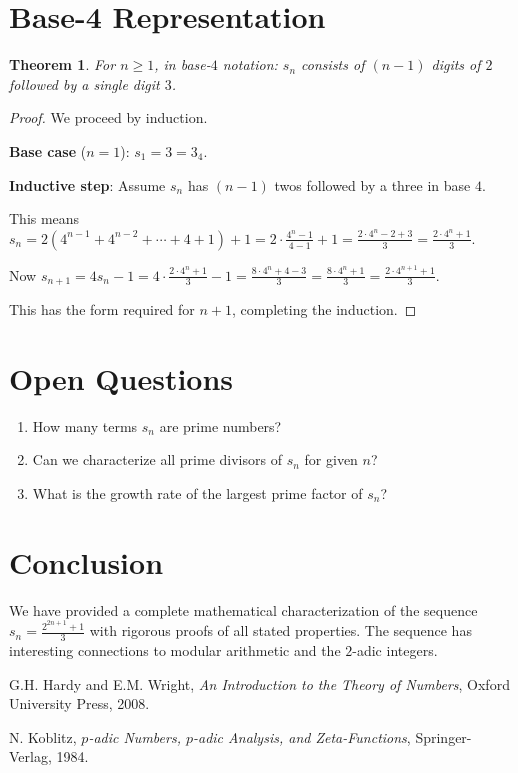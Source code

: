 \documentclass[11pt]{article}
\newtheorem{theorem}{Theorem}[section]
\theoremstyle{definition}
\begin{document}
\section{Base-4 Representation}

\begin{theorem}
For $n \geq 1$, in base-$4$ notation: $s_n$ consists of $(n-1)$ digits of $2$ followed by a single digit $3$.
\end{theorem}

\begin{proof}
We proceed by induction.

\textbf{Base case} ($n=1$): $s_1 = 3 = 3_4$. \checkmark

\textbf{Inductive step}: Assume $s_n$ has $(n-1)$ twos followed by a three in base $4$.

This means $s_n = 2(4^{n-1} + 4^{n-2} + \cdots + 4 + 1) + 1 = 2 \cdot \frac{4^n - 1}{4 - 1} + 1 = \frac{2 \cdot 4^n - 2 + 3}{3} = \frac{2 \cdot 4^n + 1}{3}$.

Now $s_{n+1} = 4s_n - 1 = 4 \cdot \frac{2 \cdot 4^n + 1}{3} - 1 = \frac{8 \cdot 4^n + 4 - 3}{3} = \frac{8 \cdot 4^n + 1}{3} = \frac{2 \cdot 4^{n+1} + 1}{3}$.

This has the form required for $n+1$, completing the induction.
\end{proof}

\section{Open Questions}

\begin{enumerate}
\item How many terms $s_n$ are prime numbers?
\item Can we characterize all prime divisors of $s_n$ for given $n$?
\item What is the growth rate of the largest prime factor of $s_n$?
\end{enumerate}

\section{Conclusion}

We have provided a complete mathematical characterization of the sequence $s_n = \frac{2^{2n+1} + 1}{3}$ with rigorous proofs of all stated properties. The sequence has interesting connections to modular arithmetic and the $2$-adic integers.

\begin{thebibliography}{9}
G.H. Hardy and E.M. Wright, \emph{An Introduction to the Theory of Numbers}, Oxford University Press, 2008.

N. Koblitz, \emph{$p$-adic Numbers, $p$-adic Analysis, and Zeta-Functions}, Springer-Verlag, 1984.
\end{thebibliography}
\end{document}
